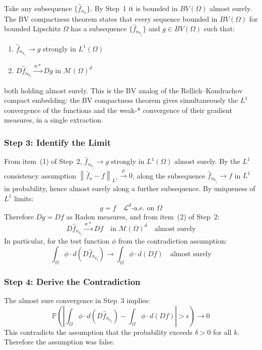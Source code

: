 \documentclass[12pt]{article}
\newcommand{\norm}[1]{\left\| #1 \right\|}
\newcommand{\Lone}{L^1(\Omega)}
\newcommand{\BV}{BV(\Omega)}
\newcommand{\cM}{\mathcal{M}(\Omega)^d}
\newcommand{\fn}{\hat{f}_n}
\newcommand{\xrightarrowp}{\xrightarrow{p}}
\begin{document}
	Take any subsequence $\{\hat{f}_{n_k}\}$. By Step~1 it is bounded in
	$\BV$ almost surely. The BV compactness theorem
	\citep[Theorem~5.5]{evans2015measure} states that every sequence bounded in
	$BV(\Omega)$ for bounded Lipschitz $\Omega$ has a subsequence
	$\{\hat{f}_{n_{k_j}}\}$ and $g \in \BV$ such that:
	\begin{enumerate}
		\item $\hat{f}_{n_{k_j}} \to g$ strongly in $\Lone$
		\item $D\hat{f}_{n_{k_j}} \xrightarrow{w*} Dg$ in $\cM$
	\end{enumerate}
	both holding almost surely. This is the BV analog of the Rellich--Kondrachov
	compact embedding: the BV compactness theorem gives simultaneously the $L^1$
	convergence of the functions and the weak-* convergence of their gradient
	measures, in a single extraction.
	
	\subsubsection*{Step 3: Identify the Limit}
	
	From item~(1) of Step~2, $\hat{f}_{n_{k_j}} \to g$ strongly in $\Lone$
	almost surely. By the $L^1$ consistency assumption
	$\norm{\fn - f}_{L^1} \xrightarrowp 0$, along the subsequence
	$\hat{f}_{n_{k_j}} \to f$ in $L^1$ in probability, hence almost surely
	along a further subsequence. By uniqueness of $L^1$ limits:
	\begin{equation}
		g = f \quad \mathcal{L}^d\text{-a.e.\ on } \Omega
	\end{equation}
	Therefore $Dg = Df$ as Radon measures, and from item~(2) of Step~2:
	\begin{equation}
		D\hat{f}_{n_{k_j}} \xrightarrow{w*} Df \quad \text{in } \cM
		\quad \text{almost surely}
	\end{equation}
	In particular, for the test function $\phi$ from the contradiction
	assumption:
	\begin{equation}
		\int_\Omega \phi \cdot d(D\hat{f}_{n_{k_j}})
		\to \int_\Omega \phi \cdot d(Df)
		\quad \text{almost surely}
	\end{equation}
	
	\subsubsection*{Step 4: Derive the Contradiction}
	
	The almost sure convergence in Step~3 implies:
	\begin{equation}
		\mathbb{P}\!\left(\left|
		\int_\Omega \phi \cdot d(D\hat{f}_{n_{k_j}})
		- \int_\Omega \phi \cdot d(Df)
		\right| > \epsilon\right) \to 0
	\end{equation}
	This contradicts the assumption that the probability exceeds $\delta > 0$
	for all $k$. Therefore the assumption was false.
	
\end{document}
